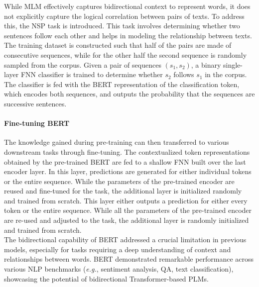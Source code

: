 While \ac{MLM} effectively captures bidirectional context to represent words, it does not explicitly capture the logical correlation between pairs of texts. To address this, the \ac{NSP} task is introduced. This task involves determining whether two sentences follow each other and helps in modeling the relationship between texts. The training dataset is constructed such that half of the pairs are made of consecutive sequences, while for the other half the second sequence is randomly sampled from the corpus. Given a pair of sequences $(s_1, s_2)$, a binary single-layer \ac{FNN} classifier is trained to determine whether $s_2$ follows $s_1$ in the corpus. The classifier is fed with the \ac{BERT} representation of the classification token, which encodes both sequences, and outputs the probability that the sequences are successive sentences. 


\paragraph{Fine-tuning BERT}

The knowledge gained during pre-training can then transferred to various downstream tasks through fine-tuning. The contextualized token representations obtained by the pre-trained \ac{BERT} are fed to a shallow \ac{FNN} built over the last encoder layer. In this layer, predictions are generated for either individual tokens or the entire sequence. While the parameters of the pre-trained encoder are reused and fine-tuned for the task, the additional layer is initialized randomly and trained from scratch. This layer either outputs a prediction for either every token or the entire sequence. While all the parameters of the pre-trained encoder are re-used and adjusted to the task, the additional layer is randomly initialized and trained from scratch. \\

The bidirectional capability of \ac{BERT} addressed a crucial limitation in previous models, especially for tasks requiring a deep understanding of context and relationships between words. \ac{BERT} demonstrated remarkable performance across various NLP benchmarks (\textit{e.g.}, sentiment analysis, \ac{QA}, text classification), showcasing the potential of bidirectional Transformer-based PLMs.
 
